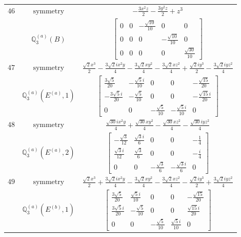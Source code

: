 \documentclass[fleqn,8pt,landscape]{jsarticle}
\begin{document}
\begin{longtable}{ccc}
$ 46 $ & $ \text{symmetry} $ & $ - \frac{3 x^{2} z}{2} - \frac{3 y^{2} z}{2} + z^{3} $ \\
$  $ & $ \mathbb{Q}_{3}^{(a)}(B) $ & $ \begin{bmatrix} 0 & 0 & - \frac{\sqrt{10}}{10} & 0 & 0 \\ 0 & 0 & 0 & - \frac{\sqrt{10}}{10} & 0 \\ 0 & 0 & 0 & 0 & \frac{\sqrt{30}}{10} \end{bmatrix} $ \\ \hline
$ 47 $ & $ \text{symmetry} $ & $ \frac{\sqrt{2} x^{3}}{2} - \frac{3 \sqrt{2} i x^{2} y}{4} - \frac{3 \sqrt{2} x y^{2}}{4} - \frac{3 \sqrt{2} x z^{2}}{4} + \frac{\sqrt{2} i y^{3}}{2} - \frac{3 \sqrt{2} i y z^{2}}{4} $ \\
$  $ & $ \mathbb{Q}_{3}^{(a)}(E^{(a)},1) $ & $ \begin{bmatrix} \frac{3 \sqrt{5}}{20} & - \frac{\sqrt{5} i}{10} & 0 & 0 & - \frac{\sqrt{15}}{20} \\ - \frac{3 \sqrt{5} i}{20} & - \frac{\sqrt{5}}{10} & 0 & 0 & - \frac{\sqrt{15} i}{20} \\ 0 & 0 & - \frac{\sqrt{5}}{10} & - \frac{\sqrt{5} i}{10} & 0 \end{bmatrix} $ \\ \hline
$ 48 $ & $ \text{symmetry} $ & $ \frac{\sqrt{30} i x^{2} y}{4} + \frac{\sqrt{30} x y^{2}}{4} - \frac{\sqrt{30} x z^{2}}{4} - \frac{\sqrt{30} i y z^{2}}{4} $ \\
$  $ & $ \mathbb{Q}_{3}^{(a)}(E^{(a)},2) $ & $ \begin{bmatrix} - \frac{\sqrt{3}}{12} & \frac{\sqrt{3} i}{6} & 0 & 0 & - \frac{1}{4} \\ \frac{\sqrt{3} i}{12} & \frac{\sqrt{3}}{6} & 0 & 0 & - \frac{i}{4} \\ 0 & 0 & - \frac{\sqrt{3}}{6} & - \frac{\sqrt{3} i}{6} & 0 \end{bmatrix} $ \\ \hline
$ 49 $ & $ \text{symmetry} $ & $ \frac{\sqrt{2} x^{3}}{2} + \frac{3 \sqrt{2} i x^{2} y}{4} - \frac{3 \sqrt{2} x y^{2}}{4} - \frac{3 \sqrt{2} x z^{2}}{4} - \frac{\sqrt{2} i y^{3}}{2} + \frac{3 \sqrt{2} i y z^{2}}{4} $ \\
$  $ & $ \mathbb{Q}_{3}^{(a)}(E^{(b)},1) $ & $ \begin{bmatrix} \frac{3 \sqrt{5}}{20} & \frac{\sqrt{5} i}{10} & 0 & 0 & - \frac{\sqrt{15}}{20} \\ \frac{3 \sqrt{5} i}{20} & - \frac{\sqrt{5}}{10} & 0 & 0 & \frac{\sqrt{15} i}{20} \\ 0 & 0 & - \frac{\sqrt{5}}{10} & \frac{\sqrt{5} i}{10} & 0 \end{bmatrix} $ \\ \hline

\end{longtable}
\end{document}

